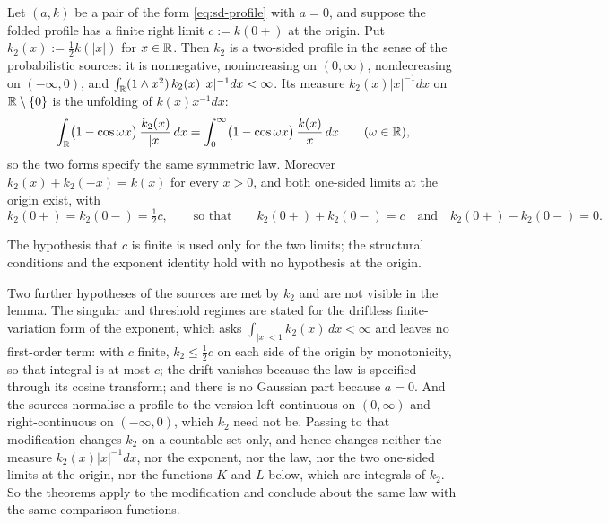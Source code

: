 \begin{lemma}\label{lem:folding-translation}
Let $(a,k)$ be a pair of the form \ref{eq:sd-profile} with $a = 0$, and suppose the folded
profile has a finite right limit $c := k(0{+})$ at the origin. Put $k_2(x) := \tfrac12 k(|x|)$
for $x \in \mathbb{R}$. Then $k_2$ is a two-sided profile in the sense of the probabilistic sources:
it is nonnegative, nonincreasing on $(0,\infty)$, nondecreasing on $(-\infty,0)$, and
$\int_{\mathbb{R}} (1 \wedge x^2)\,k_2(x)\,|x|^{-1}dx < \infty$. Its \Levy{} measure
$k_2(x)|x|^{-1}dx$ on $\mathbb{R} \setminus \{0\}$ is the unfolding of $k(x)x^{-1}dx$:
\[
  \int_{\mathbb{R}} \bigl(1 - \cos\omega x\bigr)\,\frac{k_2(x)}{|x|}\,dx
   = \int_0^\infty \bigl(1 - \cos\omega x\bigr)\,\frac{k(x)}{x}\,dx
   \qquad (\omega \in \mathbb{R}),
\]
so the two forms specify the same symmetric law. Moreover $k_2(x) + k_2(-x) = k(x)$ for every
$x > 0$, and both one-sided limits at the origin exist, with
\[
  k_2(0{+}) = k_2(0{-}) = \tfrac12 c,
  \qquad\text{so that}\qquad
  k_2(0{+}) + k_2(0{-}) = c \quad\text{and}\quad k_2(0{+}) - k_2(0{-}) = 0 .
\]
\end{lemma}

The hypothesis that $c$ is finite is used only for the two limits; the structural conditions
and the exponent identity hold with no hypothesis at the origin.

Two further hypotheses of the sources are met by $k_2$ and are not visible in the lemma. The
singular and threshold regimes are stated for the driftless finite-variation form of the exponent,
which asks $\int_{|x|<1}k_2(x)\,dx < \infty$ and leaves no first-order term: with $c$ finite,
$k_2 \le \tfrac12c$ on each side of the origin by monotonicity, so that integral is at most $c$;
the drift vanishes because the law is specified through its cosine transform; and there is no
Gaussian part because $a = 0$. And the sources normalise a profile to the version left-continuous
on $(0,\infty)$ and right-continuous on $(-\infty,0)$, which $k_2$ need not be. Passing to that
modification changes $k_2$ on a countable set only, and hence changes neither the \Levy{} measure
$k_2(x)|x|^{-1}dx$, nor the exponent, nor the law, nor the two one-sided limits at the origin, nor
the functions $K$ and $L$ below, which are integrals of $k_2$. So the theorems apply to the
modification and conclude about the same law with the same comparison functions.

